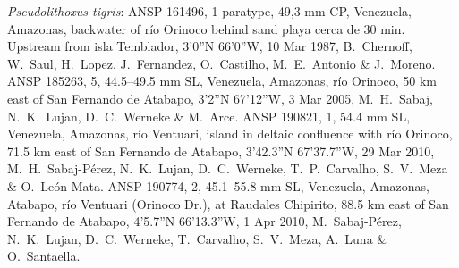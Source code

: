 \documentclass[12pt]{article}
\begin{document}
\noindent \emph{Pseudolithoxus tigris}: ANSP 161496, 1 paratype, 49,3 mm CP, Venezuela, Amazonas, backwater of río Orinoco behind sand playa cerca de 30 min. Upstream from isla Temblador, 3’0”N 66’0”W, 10 Mar 1987, B.\ Chernoff, W.\ Saul, H.\ Lopez, J.\ Fernandez, O.\ Castilho, M.\ E.\ Antonio \& J.\ Moreno. %
ANSP 185263, 5, 44.5--49.5 mm SL, Venezuela, Amazonas, río Orinoco, 50 km east of San Fernando de Atabapo, 3’2”N 67’12”W, 3 Mar 2005, M.\ H.\ Sabaj, N.\ K.\ Lujan, D.\ C.\ Werneke \& M.\ Arce. %
ANSP 190821, 1, 54.4 mm SL, Venezuela, Amazonas, río Ventuari, island in deltaic confluence with río Orinoco, 71.5 km east of San Fernando de Atabapo, 3’42.3”N 67’37.7”W, 29 Mar 2010, M.\ H.\ Sabaj-Pérez, N.\ K.\ Lujan, D.\ C.\ Werneke, T.\ P.\ Carvalho, S.\ V.\ Meza \& O.\ León Mata. %
ANSP 190774, 2, 45.1--55.8 mm SL, Venezuela, Amazonas, Atabapo, río Ventuari (Orinoco Dr.), at Raudales Chipirito, 88.5 km east of San Fernando de Atabapo, 4’5.7”N 66’13.3”W, 1 Apr 2010, M.\ Sabaj-Pérez, N.\ K.\ Lujan, D.\ C.\ Werneke, T.\ Carvalho, S.\ V.\ Meza, A.\ Luna \& O.\ Santaella.%


\clearpage
\end{document}
